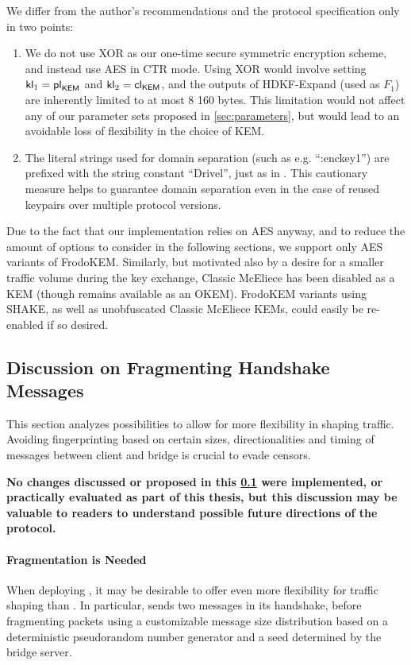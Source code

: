 We differ from the author's recommendations and the protocol specification only in two points:
\begin{enumerate}
    \item We do not use XOR as our one-time secure symmetric encryption scheme, and instead use AES in CTR mode. Using XOR would involve setting $\mathsf{kl}_1 = \mathsf{pl}_{\mathsf{KEM}}$ and $\mathsf{kl}_2 = \mathsf{cl}_{\mathsf{KEM}}$, and the outputs of \textsf{HDKF-Expand} (used as $F_1$) are inherently limited to at most 8 160 bytes. This limitation would not affect any of our parameter sets proposed in \cref{sec:parameters}, but would lead to an avoidable loss of flexibility in the choice of KEM.

    \item The literal strings used for domain separation (such as e.g. ``:enckey1'') are prefixed with the string constant ``Drivel'', just as in \obfsfour{}. This cautionary measure helps to guarantee domain separation even in the case of reused keypairs over multiple protocol versions.
\end{enumerate}

Due to the fact that our implementation relies on AES anyway, and to reduce the amount of options to consider in the following sections, we support only AES variants of FrodoKEM. Similarly, but motivated also by a desire for a smaller traffic volume during the key exchange, Classic McEliece has been disabled as a KEM (though remains available as an OKEM). FrodoKEM variants using SHAKE, as well as unobfuscated Classic McEliece KEMs, could easily be re-enabled if so desired.

\subsection{Discussion on Fragmenting Handshake Messages} \label{ssec:fragmentation}

This section analyzes possibilities to allow for more flexibility in shaping \drivel{} traffic. Avoiding fingerprinting based on certain sizes, directionalities and timing of messages between client and bridge is crucial to evade censors.

\textbf{No changes discussed or proposed in this \cref{ssec:fragmentation} were implemented, or practically evaluated as part of this thesis, but this discussion may be valuable to readers to understand possible future directions of the protocol.}

\paragraph{Fragmentation is Needed}
When deploying \drivel{}, it may be desirable to offer even more flexibility for traffic shaping than \obfsfour{}. In particular, \obfsfour{} sends two messages in its handshake, before fragmenting packets using a customizable message size distribution based on a deterministic pseudorandom number generator and a seed determined by the bridge server.

